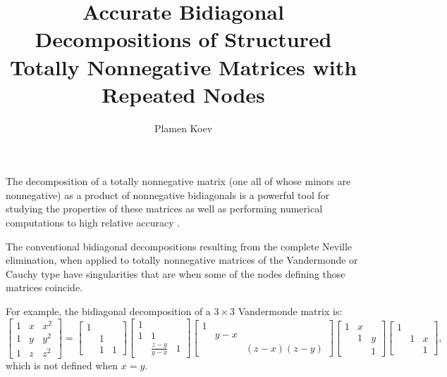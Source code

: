 \documentclass[a4paper]{amsart}
\date{}
\begin{document}
\title{Accurate Bidiagonal Decompositions of Structured Totally Nonnegative Matrices with Repeated Nodes}
\author{Plamen Koev} %
\address{San Jose State University} %

\maketitle


The decomposition of a totally nonnegative matrix (one all of whose minors are nonnegative) as a product of nonnegative bidiagonals is a powerful tool for studying the properties of these matrices \cite{fallat01} as well as performing numerical computations to high relative accuracy \cite{koevSTN}.

The conventional bidiagonal decompositions resulting from the complete Neville elimination, when applied to totally nonnegative matrices of the Vandermonde or Cauchy type have singularities that are when some of the nodes defining those matrices coincide.

For example, the bidiagonal decomposition of a $3\times 3$ Vandermonde matrix is:
$$
\left[\begin{matrix} 
1 & x & x^2 \\
1 & y & y^2 \\
1 & z & z^2 
\end{matrix}\right]
\!\!=\!\!
\left[\begin{matrix}
1 \\
& 1\\
& 1 & 1
\end{matrix}\right]
\!\!\!\!
\left[\begin{matrix}
1 \\
1 & 1\\
& \frac{z-y}{y-x} & 1
\end{matrix}\right]
\!\!\!\!
\left[\begin{matrix}
1 \\
& \!\!y-x\\
&  &\!\!\!\!\! (z-x)(z-y)
\end{matrix}\right]
\!\!\!\!
\left[\begin{matrix}
1 & x\\
& 1 & y\\
&  & 1
\end{matrix}\right]
\!\!\!\!
\left[\begin{matrix}
1   \\
& 1& x\\
& & 1 
\end{matrix}\right],
$$
which is not defined when $x=y$. 
\end{document}
